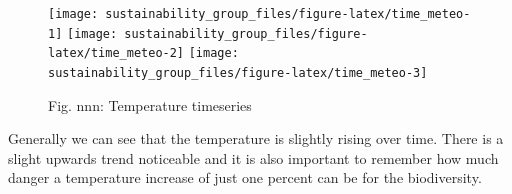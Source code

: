 \documentclass[
]{article}
\newenvironment{Shaded}{\begin{snugshade}}{\end{snugshade}}
\newcommand{\AttributeTok}[1]{\textcolor[rgb]{0.77,0.63,0.00}{#1}}
\newcommand{\CommentTok}[1]{\textcolor[rgb]{0.56,0.35,0.01}{\textit{#1}}}
\newcommand{\DecValTok}[1]{\textcolor[rgb]{0.00,0.00,0.81}{#1}}
\newcommand{\DocumentationTok}[1]{\textcolor[rgb]{0.56,0.35,0.01}{\textbf{\textit{#1}}}}
\newcommand{\FunctionTok}[1]{\textcolor[rgb]{0.00,0.00,0.00}{#1}}
\newcommand{\NormalTok}[1]{#1}
\newcommand{\OtherTok}[1]{\textcolor[rgb]{0.56,0.35,0.01}{#1}}
\newcommand{\SpecialCharTok}[1]{\textcolor[rgb]{0.00,0.00,0.00}{#1}}
\newcommand{\StringTok}[1]{\textcolor[rgb]{0.31,0.60,0.02}{#1}}
\begin{document}
\begin{Shaded}
\end{Shaded}

\begin{figure}
\texttt{[image: sustainability\_group\_files/figure-latex/time\_meteo-1]} \texttt{[image: sustainability\_group\_files/figure-latex/time\_meteo-2]} \texttt{[image: sustainability\_group\_files/figure-latex/time\_meteo-3]} \caption{Fig. nnn: Temperature timeseries}\label{fig:time_meteo}
\end{figure}

Generally we can see that the temperature is slightly rising over time.
There is a slight upwards trend noticeable and it is also important to
remember how much danger a temperature increase of just one percent can
be for the biodiversity.
\end{document}
